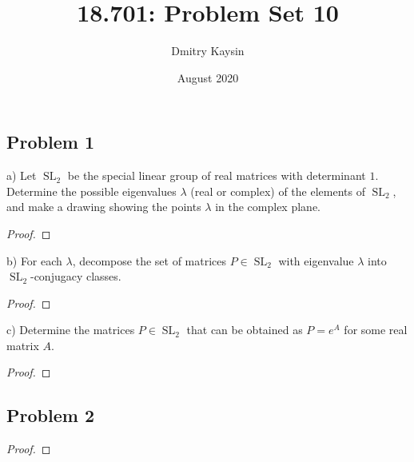 \documentclass{article}
\title{18.701: Problem Set 10}
\author{Dmitry Kaysin}
\date{August 2020}
\theoremstyle{definition}
\newcommand{\SL}{\operatorname{SL}}
\begin{document}
\maketitle 


\subsection*{Problem 1}

\begin{tcolorbox}
a) Let $\SL_2$ be the special linear group of real matrices with determinant $1$.
Determine the possible eigenvalues $\lambda$ (real or complex) of the elements of $\SL_2$, and make a drawing showing the points $\lambda$ in the complex plane.
\end{tcolorbox}

\begin{proof}
\end{proof}

\begin{tcolorbox}
b) For each $\lambda$, decompose the set of matrices $P \in \SL_2$ with eigenvalue $\lambda$ into $\SL_2$-conjugacy classes.
\end{tcolorbox}

\begin{proof}
\end{proof}

\begin{tcolorbox}
c) Determine the matrices $P \in \SL_2$ that can be obtained as $P = e^A$ for some real matrix $A$.
\end{tcolorbox}

\begin{proof}
\end{proof}

\subsection*{Problem 2}

\begin{tcolorbox}
\end{tcolorbox}

\begin{proof}
\end{proof}
\end{document}
